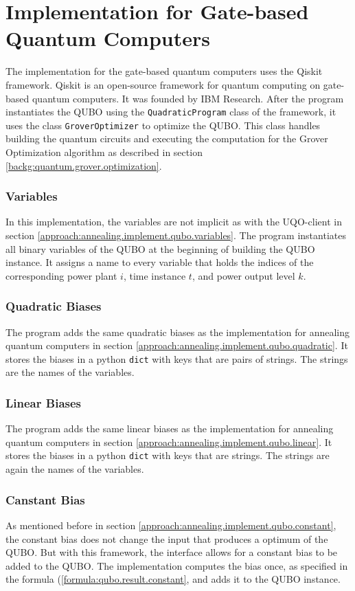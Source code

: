 \section{Implementation for Gate-based Quantum Computers}
\label{approach:gate.implement}

The implementation for the gate-based quantum computers uses the Qiskit framework.
Qiskit is an open-source framework for quantum computing on gate-based quantum computers.
It was founded by IBM Research.
\cite{QiskitWeb, QiskitGitHub}
After the program instantiates the QUBO using the \texttt{QuadraticProgram} class of the framework, it uses the class \texttt{GroverOptimizer} to optimize the QUBO.
This class handles building the quantum circuits and executing the computation for the Grover Optimization algorithm as described in section \ref{backg:quantum.grover.optimization}.

\subsubsection{Variables}

In this implementation, the variables are not implicit as with the UQO-client in section \ref{approach:annealing.implement.qubo.variables}.
The program instantiates all binary variables of the QUBO at the beginning of building the QUBO instance.
It assigns a name to every variable that holds the indices of the corresponding power plant $i$, time instance $t$, and power output level $k$.

\subsubsection{Quadratic Biases}

The program adds the same quadratic biases as the implementation for annealing quantum computers in section \ref{approach:annealing.implement.qubo.quadratic}.
It stores the biases in a python \texttt{dict} with keys that are pairs of strings.
The strings are the names of the variables.

\subsubsection{Linear Biases}

The program adds the same linear biases as the implementation for annealing quantum computers in section \ref{approach:annealing.implement.qubo.linear}.
It stores the biases in a python \texttt{dict} with keys that are strings.
The strings are again the names of the variables.

\subsubsection{Canstant Bias}

As mentioned before in section \ref{approach:annealing.implement.qubo.constant}, the constant bias does not change the input that produces a optimum of the QUBO.
But with this framework, the interface allows for a constant bias to be added to the QUBO.
The implementation computes the bias once, as specified in the formula (\ref{formula:qubo.result.constant}, and adds it to the QUBO instance.
